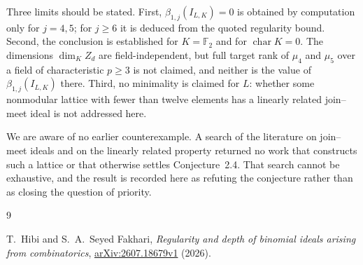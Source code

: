 \documentclass[11pt]{amsart}
\begin{document}
Three limits should be stated. First, $\beta_{1,j}(I_{L,K})=0$ is
obtained by computation only for $j=4,5$; for $j\ge6$ it is deduced from
the quoted regularity bound. Second, the conclusion is established for
$K=\mathbb F_2$ and for $\operatorname{char}K=0$. The dimensions
$\dim_KZ_d$ are field-independent, but full target rank of $\mu_4$ and
$\mu_5$ over a field of characteristic $p\ge3$ is not claimed, and
neither is the value of $\beta_{1,j}(I_{L,K})$ there. Third, no
minimality is claimed for $L$: whether some nonmodular lattice with
fewer than twelve elements has a linearly related join--meet ideal is
not addressed here.

We are aware of no earlier counterexample. A search of the literature on
join--meet ideals and on the linearly related property returned no work
that constructs such a lattice or that otherwise settles
Conjecture~2.4. That search cannot be exhaustive, and the result is
recorded here as refuting the conjecture rather than as closing the
question of priority.

\begin{thebibliography}{9}

T.~Hibi and S.~A.~Seyed Fakhari,
\emph{Regularity and depth of binomial ideals arising from combinatorics},
\href{https://arxiv.org/abs/2607.18679v1}{arXiv:2607.18679v1} (2026).

\end{thebibliography}
\end{document}
